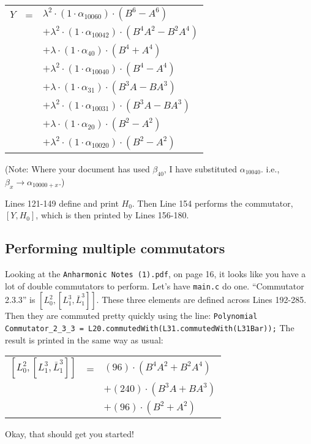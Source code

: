 \documentclass{article}
\begin{document}
\begin{table}[!hp]
\begin{center}
\begin{tabular}{rcl}
$Y$ & = & ${\lambda}^2{\cdot}(1{\cdot}{\alpha}_{10060}){\cdot}(B^{6}-A^{6})$ \\
 & & $ + {\lambda}^2{\cdot}(1{\cdot}{\alpha}_{10042}){\cdot}(B^{4}A^{2}-B^{2}A^{4})$ \\
 & & $ + {\lambda}{\cdot}(1{\cdot}{\alpha}_{40}){\cdot}(B^{4}+A^{4})$ \\
 & & $ + {\lambda}^2{\cdot}(1{\cdot}{\alpha}_{10040}){\cdot}(B^{4}-A^{4})$ \\
 & & $ + {\lambda}{\cdot}(1{\cdot}{\alpha}_{31}){\cdot}(B^{3}A-BA^{3})$ \\
 & & $ + {\lambda}^2{\cdot}(1{\cdot}{\alpha}_{10031}){\cdot}(B^{3}A-BA^{3})$ \\
 & & $ + {\lambda}{\cdot}(1{\cdot}{\alpha}_{20}){\cdot}(B^{2}-A^{2})$ \\
 & & $ + {\lambda}^2{\cdot}(1{\cdot}{\alpha}_{10020}){\cdot}(B^{2}-A^{2})$ \\
\end{tabular}
\end{center}
\end{table}

(Note: Where your document has used $\beta_{40}$, I have substituted $\alpha_{10040}$. i.e., $\beta_{x} \rightarrow \alpha_{10000+x}$.)

Lines 121-149 define and print $H_{0}$. Then Line 154 performs the commutator, $[Y,H_0]$, which is then printed by Lines 156-180.

\newpage

\subsection{Performing multiple commutators}

Looking at the \texttt{Anharmonic Notes (1).pdf}, on page 16, it looks like you have a lot of double commutators to perform. Let's have \texttt{main.c} do one. ``Commutator 2.3.3'' is $[L^2_0,[L^3_1,\bar{L}^3_1]]$. These three elements are defined across Lines 192-285. Then they are commuted pretty quickly using the line:
\newline
\newline
\texttt{Polynomial Commutator\_2\_3\_3 = L20.commutedWith(L31.commutedWith(L31Bar));}
\newline
\newline
The result is printed in the same way as usual:
\begin{table}[!hp]
\begin{center}
\begin{tabular}{rcl}
$[L^{2}_{0},[L^{3}_{1},\bar{L}^{3}_{1}]]$ & = & $(96){\cdot}(B^{4}A^{2}+B^{2}A^{4})$ \\
 & & $ + (240){\cdot}(B^{3}A+BA^{3})$ \\
 & & $ + (96){\cdot}(B^{2}+A^{2})$ \\
\end{tabular}
\end{center}
\end{table}

Okay, that should get you started!
 
\end{document}
